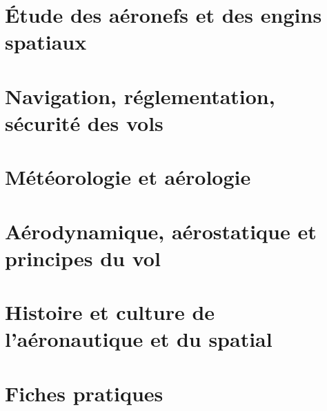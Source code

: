 \documentclass[a4paper,12pt,oneside]{report} %
\begin{document}
	\chapter{Étude des aéronefs et des engins spatiaux}
	\label{aeronef}
		
		
		
		
		
	
	\chapter{Navigation, réglementation, sécurité des vols}
	\label{nav}
		
		
		
	
	\chapter{Météorologie et aérologie}
	\label{meteo}
		
		
		
		
		
	
	\chapter{Aérodynamique, aérostatique et principes du vol}
	\label{aerodynamique}
		
		
		
		
	
	\chapter{Histoire et culture de l'aéronautique et du spatial}
	\label{histoire}
		
		
		
		
		
	\appendix
	\chapter{Fiches pratiques}
	
	
\end{document}
